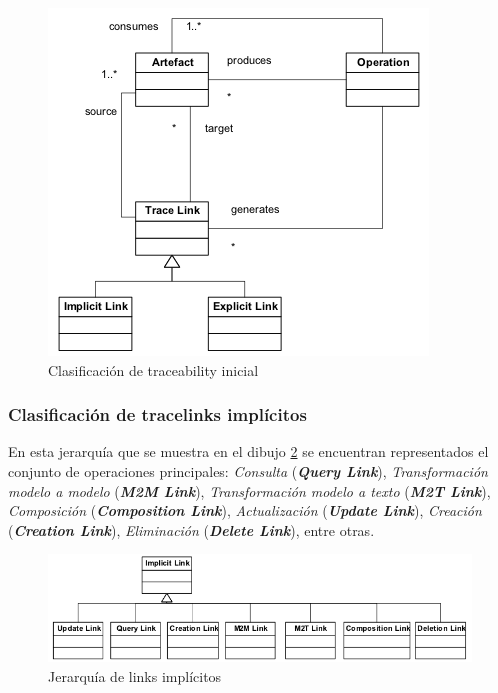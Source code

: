 \documentclass[a4paper,12pt,oneside,spanish]{book}
\begin{document}
\begin{figure}[hbtp]
\centering
\includegraphics[scale=0.75]{./img/ExplicitImplicitTraceLinkClassification}
\caption{Clasificación de traceability inicial}
\label{fig:ClasifInicial}
\end{figure}

\subsubsection{Clasificación de tracelinks implícitos}


En esta jerarquía que se muestra en el dibujo \ref{fig:LinksImplicitos} se encuentran representados el conjunto de operaciones  principales: \textit{Consulta} (\textit{\textbf{Query Link}}), \textit{Transformación modelo a modelo} (\textit{\textbf{M2M Link}}), \textit{Transformación modelo a texto} (\textit{\textbf{M2T Link}}), \textit{Composición} (\textit{\textbf{Composition Link}}), \textit{Actualización} (\textit{\textbf{Update Link}}), \textit{Creación} (\textit{\textbf{Creation Link}}), \textit{Eliminación} (\textit{\textbf{Delete Link}}), entre otras.


\begin{figure}[hbtp]
\centering
\includegraphics[scale=0.55]{./img/ImplicitTraceLinks}
\caption{Jerarquía de links implícitos}
\label{fig:LinksImplicitos}
\end{figure}
\end{document}
